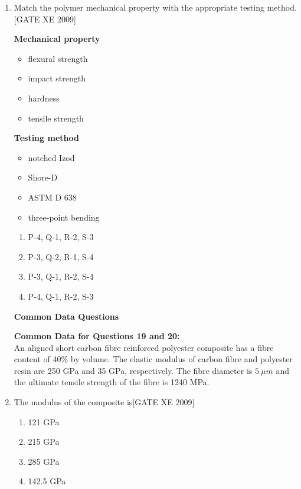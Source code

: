 \documentclass[journal,12pt,onecolumn]{IEEEtran}
\theoremstyle{remark}
\begin{document}
\begin{enumerate}
\begin{enumerate}
\begin{enumerate}[label=\textbf{Q.\arabic*.},  wide=0pt, leftmargin=*]
\item Match the polymer mechanical property with the appropriate testing method.\hfill[GATE XE 2009]\\[0.5em]
\begin{minipage}{0.45\textwidth}
\textbf{Mechanical property}
\begin{itemize}
  \item[P.] flexural strength
  \item[Q.] impact strength
  \item[R.] hardness
  \item[S.] tensile strength
\end{itemize}
\end{minipage}
\hfill
\begin{minipage}{0.45\textwidth}
\textbf{Testing method}
\begin{itemize}
  \item[1.] notched Izod
  \item[2.] Shore-D
  \item[3.] ASTM D 638
  \item[4.] three-point bending
\end{itemize}
\end{minipage}

\vspace{0.5em}
\begin{multicols}{2}
\begin{enumerate}
\item P-4, Q-1, R-2, S-3
\item P-3, Q-2, R-1, S-4
\item P-3, Q-1, R-2, S-4
\item P-4, Q-1, R-2, S-3
\end{enumerate}
\end{multicols}
\textbf{Common Data Questions}

\textbf{Common Data for Questions 19 and 20:}\\
An aligned short carbon fibre reinforced polyester composite has a fibre content of 40\% by volume. The elastic modulus of carbon fibre and polyester resin are 250 GPa and 35 GPa, respectively. The fibre diameter is $5~\mu m$ and the ultimate tensile strength of the fibre is 1240 MPa.



\item The modulus of the composite is\hfill[GATE XE 2009]
\begin{multicols}{2}
\begin{enumerate}
\item 121 GPa
\item 215 GPa
\item 285 GPa
\item 142.5 GPa
\end{enumerate}
\end{multicols}


\end{enumerate}
\end{enumerate}
\end{enumerate}
\end{document}
